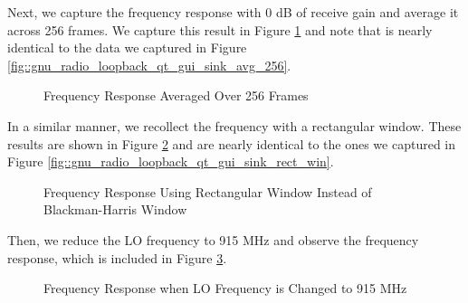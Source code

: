 \documentclass{article}
\begin{document}
Next, we capture the frequency response with 0 dB of receive gain and average it across 256 frames. We capture this result in Figure \ref{fig::gnu_radio_loopback_generic_iio_avg_256} and note that is nearly identical to the data we captured in Figure \ref{fig::gnu_radio_loopback_qt_gui_sink_avg_256}.

\begin{figure}[H]
	\centerline{}
	\caption{Frequency Response Averaged Over 256 Frames}
	\label{fig::gnu_radio_loopback_generic_iio_avg_256}
\end{figure}

In a similar manner, we recollect the frequency with a rectangular window. These results are shown in Figure \ref{fig::gnu_radio_loopback_generic_iio_rect_win} and are nearly identical to the ones we captured in Figure \ref{fig::gnu_radio_loopback_qt_gui_sink_rect_win}.

\begin{figure}[H]
	\centerline{}
	\caption{Frequency Response Using Rectangular Window Instead of Blackman-Harris Window}
	\label{fig::gnu_radio_loopback_generic_iio_rect_win}
\end{figure}

Then, we reduce the LO frequency to 915 MHz and observe the frequency response, which is included in Figure \ref{fig::gnu_radio_loopback_generic_iio_915_MHz_lo}.

\begin{figure}[H]
	\centerline{}
	\caption{Frequency Response when LO Frequency is Changed to 915 MHz}
	\label{fig::gnu_radio_loopback_generic_iio_915_MHz_lo}
\end{figure}
\end{document}
